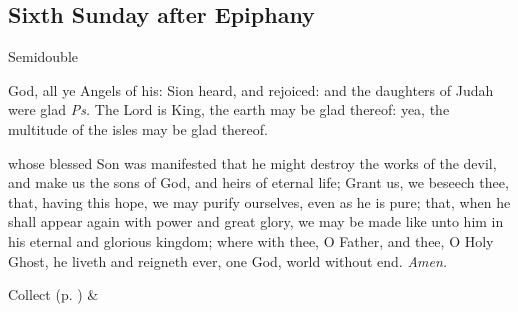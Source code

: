 \clearpage
\subsection{Sixth Sunday after Epiphany}
\begin{inhead}
{Semidouble}
\end{inhead}


\vspace{-0.4\baselineskip}

\introit

\vspace{-0.1\baselineskip}

 God, all ye Angels of his: Sion heard, and rejoiced: and the daughters of Judah were glad \textit{Ps.} The Lord is King, the earth may be glad thereof: yea, the multitude of the isles may be glad thereof.

\vspace{-0.4\baselineskip}

\collect

\vspace{-0.1\baselineskip}

 whose blessed Son was manifested that he might destroy the works of the devil, and make us the sons of God, and heirs of eternal life; Grant us, we beseech thee, that, having this hope, we may purify ourselves, even as he is pure; that, when he shall appear again with power and great glory, we may be made like unto him in his eternal and glorious kingdom; where with thee, O Father, and thee, O Holy Ghost, he liveth and reigneth ever, one God, world without end. \textit{Amen.}
\begin{rubric}
     Collect  (p. \pageref{SPSaints}) \&  
\end{rubric}

\vspace{-0.4\baselineskip}


\vspace{-0.1\baselineskip}

